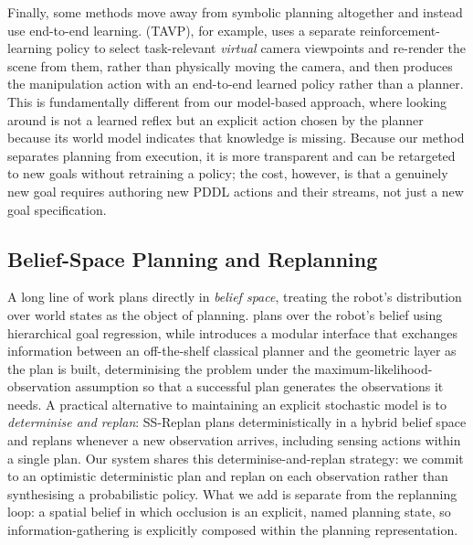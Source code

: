 Finally, some methods move away from symbolic planning altogether and instead use end-to-end learning. \cite{bai2025learning} (TAVP), for example, uses a separate reinforcement-learning policy to select task-relevant \emph{virtual} camera viewpoints and re-render the scene from them, rather than physically moving the camera, and then produces the manipulation action with an end-to-end learned policy rather than a planner. This is fundamentally different from our model-based approach, where looking around is not a learned reflex but an explicit action chosen by the planner because its world model indicates that knowledge is missing. Because our method separates planning from execution, it is more transparent and can be retargeted to new goals without retraining a policy; the cost, however, is that a genuinely new goal requires authoring new PDDL actions and their streams, not just a new goal specification.

\subsection{Belief-Space Planning and Replanning}
A long line of work plans directly in \emph{belief space}, treating the robot's distribution over world states as the object of planning. \cite{kaelbling2013integrated} plans over the robot's belief using hierarchical goal regression, while \cite{hadfield2015modular} introduces a modular interface that exchanges information between an off-the-shelf classical planner and the geometric layer as the plan is built, determinising the problem under the maximum-likelihood-observation assumption so that a successful plan generates the observations it needs. A practical alternative to maintaining an explicit stochastic model is to \emph{determinise and replan}: SS-Replan \cite{garrett2020online} plans deterministically in a hybrid belief space and replans whenever a new observation arrives, including sensing actions within a single plan. Our system shares this determinise-and-replan strategy: we commit to an optimistic deterministic plan and replan on each observation rather than synthesising a probabilistic policy. What we add is separate from the replanning loop: a spatial belief in which occlusion is an explicit, named planning state, so information-gathering is explicitly composed within the planning representation.

